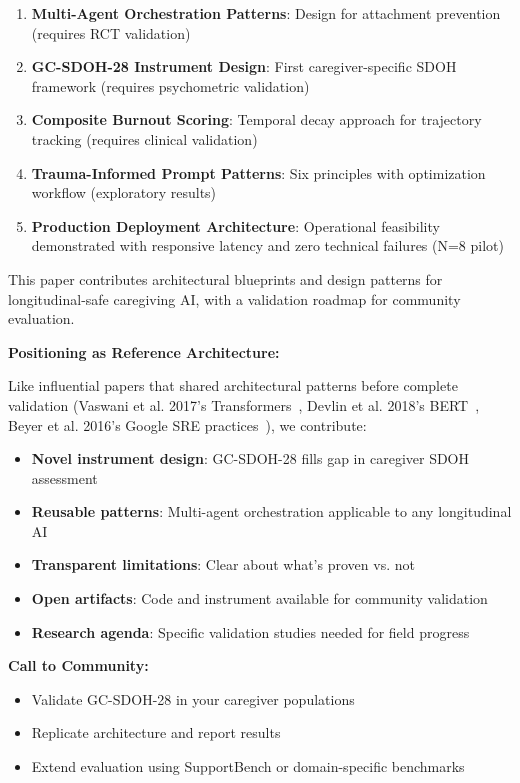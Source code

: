 \documentclass{article}
\begin{document}
\begin{enumerate}
    \item \textbf{Multi-Agent Orchestration Patterns}: Design for attachment prevention (requires RCT validation)
    \item \textbf{GC-SDOH-28 Instrument Design}: First caregiver-specific SDOH framework (requires psychometric validation)
    \item \textbf{Composite Burnout Scoring}: Temporal decay approach for trajectory tracking (requires clinical validation)
    \item \textbf{Trauma-Informed Prompt Patterns}: Six principles with optimization workflow (exploratory results)
    \item \textbf{Production Deployment Architecture}: Operational feasibility demonstrated with responsive latency and zero technical failures (N=8 pilot)
\end{enumerate}

This paper contributes architectural blueprints and design patterns for longitudinal-safe caregiving AI, with a validation roadmap for community evaluation.

\textbf{Positioning as Reference Architecture:}

Like influential papers that shared architectural patterns before complete validation (Vaswani et al. 2017's Transformers~\cite{vaswani2017}, Devlin et al. 2018's BERT~\cite{devlin2018bert}, Beyer et al. 2016's Google SRE practices~\cite{beyer2016sre}), we contribute:
\begin{itemize}
    \item \textbf{Novel instrument design}: GC-SDOH-28 fills gap in caregiver SDOH assessment
    \item \textbf{Reusable patterns}: Multi-agent orchestration applicable to any longitudinal AI
    \item \textbf{Transparent limitations}: Clear about what's proven vs. not
    \item \textbf{Open artifacts}: Code and instrument available for community validation
    \item \textbf{Research agenda}: Specific validation studies needed for field progress
\end{itemize}

\textbf{Call to Community:}
\begin{itemize}
    \item Validate GC-SDOH-28 in your caregiver populations
    \item Replicate architecture and report results
    \item Extend evaluation using SupportBench or domain-specific benchmarks
\end{itemize}
\end{document}
